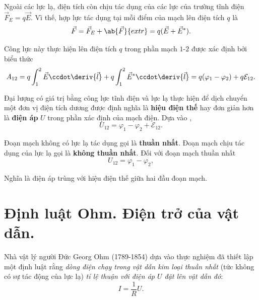 Ngoài các lực lạ, điện tích còn chịu tác dụng của các lực của trường tĩnh điện $\vec{F}_E=q\vec{E}$.
Vì thế, hợp lực tác dụng tại mỗi điểm của mạch lên điện tích $q$ là
\begin{equation*}
    \vec{F} = \vec{F}_E + \ab{\vec{F}}{extr} = q (\vec{E} + \vec{E}^*).
\end{equation*}

\noindent
Công lực này thực hiện lên điện tích $q$ trong phần mạch $1$-$2$ được xác định bởi biểu thức
\begin{equation}\label{eq:5_17}
    A_{12} = q \int_1^2 \vec{E} \ccdot \deriv{\vec{l}} + q \int_1^2 \vec{E}^* \ccdot \deriv{\vec{l}} = q (\varphi_1 - \varphi_2) + q \mathcal{E}_{12}.
\end{equation}

Đại lượng có giá trị bằng công lực tĩnh điện và lực lạ thực hiện để dịch chuyển một đơn vị điện tích dương được định nghĩa là \textbf{hiệu điện thế} hay đơn giản hơn là \textbf{điện áp} $U$ trong phần xác định của mạch điện. Dựa vào ,
\begin{equation}\label{eq:5_18}
    U_{12} = \varphi_1 - \varphi_2 + \mathcal{E}_{12}.
\end{equation}

Đoạn mạch không có lực lạ tác dụng gọi là \textbf{thuần nhất}. Đoạn mạch chịu tác dụng của lực lạ gọi là \textbf{không thuần nhất}. Đối với đoạn mạch thuần nhất 
\begin{equation}\label{eq:5_19}
    U_{12} = \varphi_1 - \varphi_2,
\end{equation}

\noindent
Nghĩa là điện áp trùng với hiệu điện thế giữa hai đầu đoạn mạch.

\section{Định luật Ohm. Điện trở của vật dẫn.}\label{sec:5_4}

Nhà vật lý người Đức Georg Ohm (1789-1854) dựa vào thực nghiệm đã thiết lập một định luật rằng \textit{dòng điện chạy trong vật dẫn kim loại thuần nhất} (tức không có sự tác động của lực lạ) \textit{tỉ lệ thuận với điện áp $U$ đặt lên vật dẫn đó}:
\begin{equation}\label{eq:5_20}
    I = \frac{1}{R} U.
\end{equation}

